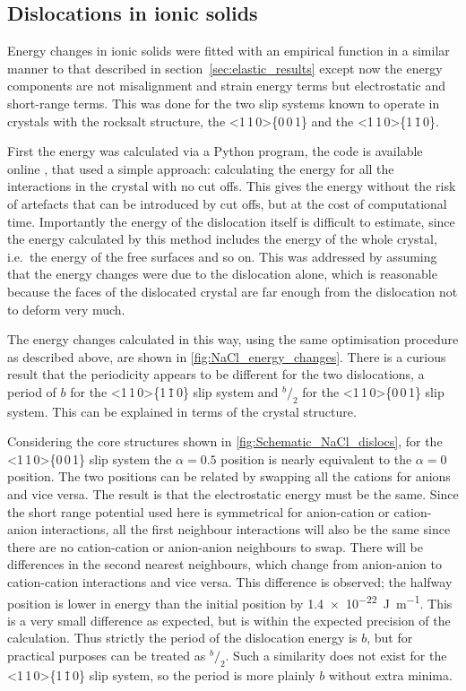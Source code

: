 \FloatBarrier
\subsection{Dislocations in ionic solids}
\FloatBarrier


Energy changes in ionic solids were fitted with an empirical function in a similar manner to that described in section~\ref{sec:elastic_results} except now the energy components are not misalignment and strain energy terms but electrostatic and short-range terms. This was done for the two slip systems known to operate in crystals with the rocksalt structure, the <1\,1\,0>\{0\,0\,1\} and the <1\,1\,0>\{1\,\={1}\,0\}.


First the energy was calculated via a Python program, the code is available online \cite{code}, that used a simple approach: calculating the energy for all the interactions in the crystal with no cut offs. This gives the energy without the risk of artefacts that can be introduced by cut offs, but at the cost of computational time. Importantly the energy of the dislocation itself is difficult to estimate, since the energy calculated by this method includes the energy of the whole crystal, i.e.\ the energy of the free surfaces and so on. This was addressed by assuming that the energy changes were due to the dislocation alone, which is reasonable because the faces of the dislocated crystal are far enough from the dislocation not to deform very much.


The energy changes calculated in this way, using the same optimisation procedure as described above, are shown in \autoref{fig:NaCl_energy_changes}. There is a curious result that the periodicity appears to be different for the two dislocations, a period of $b$ for the <1\,1\,0>\{1\,\={1}\,0\} slip system and $^b\!/_2$ for the <1\,1\,0>\{0\,0\,1\} slip system. This can be explained in terms of the crystal structure. 

Considering the core structures shown in \autoref{fig:Schematic_NaCl_dislocs}, for the <1\,1\,0>\{0\,0\,1\} slip system the $\alpha=0.5$ position is nearly equivalent to the $\alpha=0$ position. The two positions can be related by swapping all the cations for anions and vice versa. The result is that the electrostatic energy must be the same. Since the short range potential used here is symmetrical for anion-cation or cation-anion interactions, all the first neighbour interactions will also be the same since there are no cation-cation or anion-anion neighbours to swap. There will be differences in the second nearest neighbours, which change from anion-anion to cation-cation interactions and vice versa. This difference is observed; the halfway position is lower in energy than the initial position by \SI{1.4e-22}{\joule\per\meter}. This is a very small difference as expected, but is within the expected precision of the calculation. Thus strictly the period of the dislocation energy is $b$, but for practical purposes can be treated as $^b\!/_2$. Such a similarity does not exist for the <1\,1\,0>\{1\,\={1}\,0\} slip system, so the period is more plainly $b$ without extra minima.





